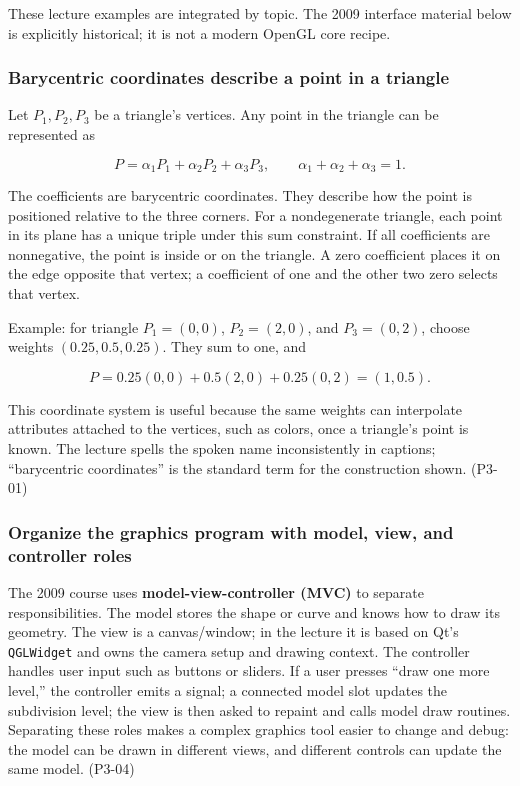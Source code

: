 These lecture examples are integrated by topic. The 2009 interface material below is explicitly historical; it is not a modern OpenGL core recipe.

\subsubsection{Barycentric coordinates describe a point in a triangle}\label{03-visual-computing-i-ch018-barycentric-coordinates-describe-a-point-in-a-triangle}

Let \(P_1,P_2,P_3\) be a triangle's vertices. Any point in the triangle can be represented as

\[
P=\alpha_1P_1+\alpha_2P_2+\alpha_3P_3,
\qquad \alpha_1+\alpha_2+\alpha_3=1.
\]

The coefficients are barycentric coordinates. They describe how the point is positioned relative to the three corners. For a nondegenerate triangle, each point in its plane has a unique triple under this sum constraint. If all coefficients are nonnegative, the point is inside or on the triangle. A zero coefficient places it on the edge opposite that vertex; a coefficient of one and the other two zero selects that vertex.

Example: for triangle \(P_1=(0,0)\), \(P_2=(2,0)\), and \(P_3=(0,2)\), choose weights \((0.25,0.5,0.25)\). They sum to one, and

\[
P=0.25(0,0)+0.5(2,0)+0.25(0,2)=(1,0.5).
\]

This coordinate system is useful because the same weights can interpolate attributes attached to the vertices, such as colors, once a triangle's point is known. The lecture spells the spoken name inconsistently in captions; ``barycentric coordinates'' is the standard term for the construction shown. (P3-01)

\subsubsection{Organize the graphics program with model, view, and controller roles}\label{03-visual-computing-i-ch018-organize-the-graphics-program-with-model-view-and-controller-roles}

The 2009 course uses \textbf{model-view-controller (MVC)} to separate responsibilities. The model stores the shape or curve and knows how to draw its geometry. The view is a canvas/window; in the lecture it is based on Qt's \texttt{QGLWidget} and owns the camera setup and drawing context. The controller handles user input such as buttons or sliders. If a user presses ``draw one more level,'' the controller emits a signal; a connected model slot updates the subdivision level; the view is then asked to repaint and calls model draw routines. Separating these roles makes a complex graphics tool easier to change and debug: the model can be drawn in different views, and different controls can update the same model. (P3-04)

